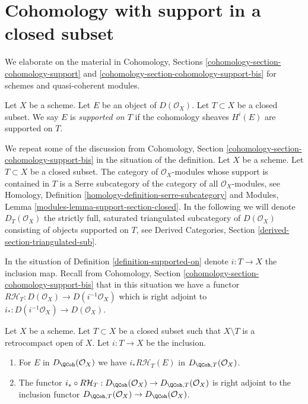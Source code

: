 \section{Cohomology with support in a closed subset}
\label{section-cohomology-support}

\noindent
We elaborate on the material in Cohomology, Sections
\ref{cohomology-section-cohomology-support} and
\ref{cohomology-section-cohomology-support-bis} for schemes
and quasi-coherent modules.

\begin{definition}
\label{definition-supported-on}
Let $X$ be a scheme. Let $E$ be an object of $D(\mathcal{O}_X)$.
Let $T \subset X$ be a closed subset.
We say $E$ is {\it supported on $T$} if the
cohomology sheaves $H^i(E)$ are supported on $T$.
\end{definition}

\noindent
We repeat some of the discussion from
Cohomology, Section \ref{cohomology-section-cohomology-support-bis}
in the situation of the definition.
Let $X$ be a scheme. Let $T \subset X$ be a closed subset.
The category of $\mathcal{O}_X$-modules whose
support is contained in $T$ is a Serre subcategory of the
category of all $\mathcal{O}_X$-modules, see
Homology, Definition \ref{homology-definition-serre-subcategory}
and
Modules, Lemma \ref{modules-lemma-support-section-closed}.
In the following we will denote $D_T(\mathcal{O}_X)$
the strictly full, saturated triangulated subcategory of
$D(\mathcal{O}_X)$ consisting of objects supported on $T$, see
Derived Categories, Section \ref{derived-section-triangulated-sub}.

\medskip\noindent
In the situation of Definition \ref{definition-supported-on}
denote $i : T \to X$ the inclusion map. Recall from
Cohomology, Section \ref{cohomology-section-cohomology-support-bis}
that in this situation we have a functor
$R\mathcal{H}_T : D(\mathcal{O}_X) \to D(i^{-1}\mathcal{O}_X)$
which is right adjoint to $i_* : D(i^{-1}\mathcal{O}_X) \to D(\mathcal{O}_X)$.

\begin{lemma}
\label{lemma-support-quasi-coherent}
Let $X$ be a scheme. Let $T \subset X$ be a closed subset such that
$X \setminus T$ is a retrocompact open of $X$. Let $i : T \to X$ be
the inclusion.
\begin{enumerate}
\item For $E$ in $D_\QCoh(\mathcal{O}_X)$ we have
$i_*R\mathcal{H}_T(E)$ in $D_{\QCoh, T}(\mathcal{O}_X)$.
\item The functor
$i_* \circ R\mathcal{H}_T : D_\QCoh(\mathcal{O}_X) \to
D_{\QCoh, T}(\mathcal{O}_X)$ is right adjoint to the inclusion functor
$D_{\QCoh, T}(\mathcal{O}_X) \to D_\QCoh(\mathcal{O}_X)$.
\end{enumerate}
\end{lemma}

